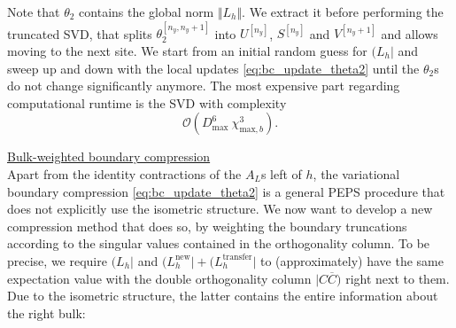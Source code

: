 Note that $\theta_2$ contains the global norm $\Vert L_h \Vert$. We extract it before performing the truncated SVD, that splits $\theta_2^{[n_y, n_y+1]}$ into $U^{[n_y]}$, $S^{[n_y]}$ and $V^{[n_y+1]}$ and allows moving to the next site. We start from an initial random guess for $(L_h\vert$ and sweep up and down with the local updates \eqref{eq:bc_update_theta2} until the $\theta_2$s do not change significantly anymore. The most expensive part regarding computational runtime is the SVD with complexity
\begin{equation}
	\mathcal{O}( D_{\text{max}}^6 \: \chi_{\text{max}, b}^3 ).
\end{equation}

\newpage
\noindent \underline{Bulk-weighted boundary compression} \\[0.5em]
Apart from the identity contractions of the $A_L$s left of $h$, the variational boundary compression \eqref{eq:bc_update_theta2} is a general PEPS procedure that does not explicitly use the isometric structure. We now want to develop a new compression method that does so, by weighting the boundary truncations according to the singular values contained in the orthogonality column. To be precise, we require $( L_h \vert$ and $(L_h^{\text{new}} \vert + (L_h^{\text{transfer}} \vert$ to (approximately) have the same expectation value with the double orthogonality column $\vert C \overline{C} )$ right next to them. Due to the isometric structure, the latter contains the entire information about the right bulk:
